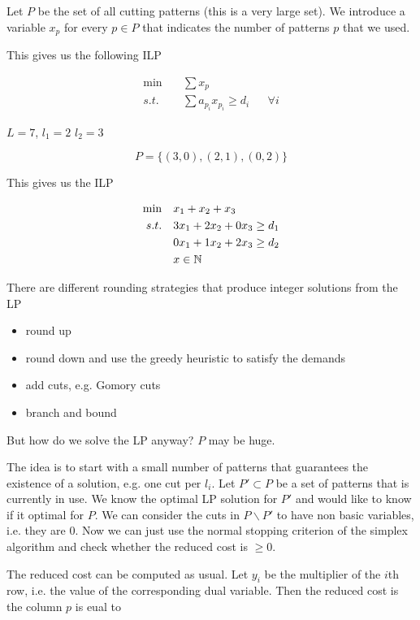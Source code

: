Let $P$ be the set of all cutting patterns (this is a very large set). We introduce a variable $x_p$ for every $p\in P$ that indicates the number of patterns $p$ that we used.

This gives us the following ILP

\begin{align*}
\min \quad & \sum x_p\\
s.t. \quad & \sum a_{p_i}x_{p_i} \geq d_i && \forall i
\end{align*}

\begin{Ex} $L=7$, $l_1=2$ $l_2=3$

\[P=\{(3,0),(2,1),(0,2)\}\]

This gives us the ILP

\begin{align*}
\min \quad & x_1+x_2+x_3\\
s.t.\quad & 3x_1+2x_2+0x_3 \geq d_1\\
	&0x_1 + 1x_2+ 2x_3 \geq d_2\\
	&x\in \mathbb{N}
\end{align*}
\end{Ex}

There are different rounding strategies that produce integer solutions from the LP

\begin{itemize}
\item round up
\item round down and use the greedy heuristic to satisfy the demands
\item add cuts, e.g. Gomory cuts
\item branch and bound
\end{itemize}

But how do we solve the LP anyway? $P$ may be huge.

The idea is to start with a small number of patterns that guarantees the existence of a solution, e.g. one cut per $l_i$. Let $P'\subset P$ be a set of patterns that is currently in use. We know the optimal LP solution for $P'$ and would like to know if it optimal for $P$. We can consider the cuts in $P\backslash P'$ to have non basic variables, i.e. they are 0. Now we can just use the normal stopping criterion of the simplex algorithm and check whether the reduced cost is $\geq 0$.

The reduced cost can be computed as usual. Let $y_i$ be the multiplier of the $i$th row, i.e. the value of the corresponding dual variable. Then the reduced cost is the column $p$ is eual to

